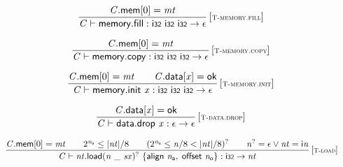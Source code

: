 $$
\begin{array}{@{}c@{}}\displaystyle
\frac{
{\mathit{C}}.\mathsf{mem}{}[0] = {\mathit{mt}}
}{
{\mathit{C}} \vdash \mathsf{memory.fill} : \mathsf{i{\scriptstyle32}}~\mathsf{i{\scriptstyle32}}~\mathsf{i{\scriptstyle32}} \rightarrow \epsilon
} \, {[\textsc{\scriptsize T{-}memory.fill}]}
\qquad
\end{array}
$$

$$
\begin{array}{@{}c@{}}\displaystyle
\frac{
{\mathit{C}}.\mathsf{mem}{}[0] = {\mathit{mt}}
}{
{\mathit{C}} \vdash \mathsf{memory.copy} : \mathsf{i{\scriptstyle32}}~\mathsf{i{\scriptstyle32}}~\mathsf{i{\scriptstyle32}} \rightarrow \epsilon
} \, {[\textsc{\scriptsize T{-}memory.copy}]}
\qquad
\end{array}
$$

$$
\begin{array}{@{}c@{}}\displaystyle
\frac{
{\mathit{C}}.\mathsf{mem}{}[0] = {\mathit{mt}}
 \qquad
{\mathit{C}}.\mathsf{data}{}[{\mathit{x}}] = \mathsf{ok}
}{
{\mathit{C}} \vdash \mathsf{memory.init}~{\mathit{x}} : \mathsf{i{\scriptstyle32}}~\mathsf{i{\scriptstyle32}}~\mathsf{i{\scriptstyle32}} \rightarrow \epsilon
} \, {[\textsc{\scriptsize T{-}memory.init}]}
\qquad
\end{array}
$$

$$
\begin{array}{@{}c@{}}\displaystyle
\frac{
{\mathit{C}}.\mathsf{data}{}[{\mathit{x}}] = \mathsf{ok}
}{
{\mathit{C}} \vdash \mathsf{data.drop}~{\mathit{x}} : \epsilon \rightarrow \epsilon
} \, {[\textsc{\scriptsize T{-}data.drop}]}
\qquad
\end{array}
$$

$$
\begin{array}{@{}c@{}}\displaystyle
\frac{
{\mathit{C}}.\mathsf{mem}{}[0] = {\mathit{mt}}
 \qquad
{2^{{\mathit{n}}_{{\mathsf{a}}}}} \leq {|{\mathit{nt}}|} / 8
 \qquad
({2^{{\mathit{n}}_{{\mathsf{a}}}}} \leq {\mathit{n}} / 8 < {|{\mathit{nt}}|} / 8)^?
 \qquad
{{\mathit{n}}^?} = \epsilon \lor {\mathit{nt}} = {\mathsf{i}}{{\mathit{n}}}
}{
{\mathit{C}} \vdash {{\mathit{nt}}.\mathsf{load}}{{({\mathit{n}}~\mathsf{\_}~{\mathit{sx}})^?}}~\{ \begin{array}[t]{@{}l@{}}
\mathsf{align}~{\mathit{n}}_{{\mathsf{a}}},\; \mathsf{offset}~{\mathit{n}}_{{\mathsf{o}}} \}\end{array} : \mathsf{i{\scriptstyle32}} \rightarrow {\mathit{nt}}
} \, {[\textsc{\scriptsize T{-}load}]}
\qquad
\end{array}
$$

